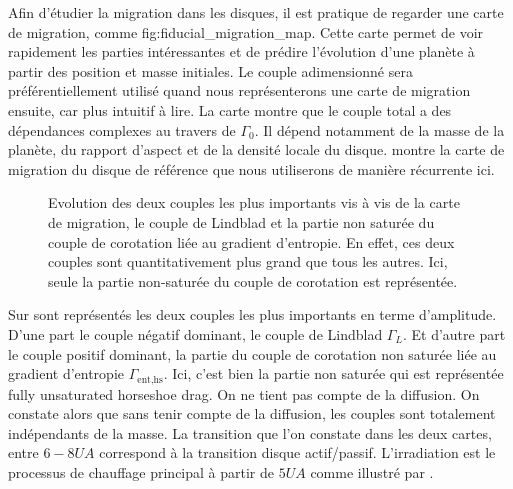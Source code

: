 Afin d'étudier la migration dans les disques, il est pratique de 
regarder une \og carte de migration\fg, comme 
{fig:fiducial_migration_map}. Cette carte permet de voir rapidement 
les parties intéressantes et de prédire l'évolution d'une planète à 
partir des position et masse initiales. Le couple adimensionné 
 sera préférentiellement utilisé quand 
nous représenterons une carte de migration ensuite, car plus intuitif 
à lire. La carte  montre que le couple 
total a des dépendances complexes au travers de $\Gamma_0$. Il 
dépend notamment de la masse de la planète, du rapport d'aspect et 
de la densité locale du disque.  montre la carte de migration du disque de référence que nous utiliserons de manière
récurrente ici. 

\begin{figure}[htbp]
\centering
{}\hfill
{}

\caption{Evolution des deux couples les plus importants vis à vis de la carte de migration, le couple de Lindblad et la partie
non saturée du couple de corotation liée au gradient d'entropie. En effet, ces deux couples sont quantitativement plus grand que
tous les autres. Ici, seule la partie non-saturée du couple de corotation est représentée.}\label{fig:details_maps}
\end{figure}

Sur  sont représentés les deux couples les plus importants en terme d'amplitude. D'une part le couple négatif dominant, le
couple de Lindblad $\Gamma_L$. Et d'autre part le couple positif dominant, la partie du couple de corotation non saturée liée au gradient d'entropie
$\Gamma_\text{ent,hs}$. Ici, c'est bien la partie non saturée qui est représentée \og fully unsaturated horseshoe drag\fg. On ne tient pas
compte de la diffusion. On constate alors que sans tenir compte de la diffusion, les couples sont totalement indépendants de la
masse. La transition que l'on constate dans les deux cartes, entre $6-8\unit{UA}$ correspond à la transition disque
actif/passif. L'irradiation est le processus de chauffage principal à partir de $5\unit{UA}$ comme illustré par
.

